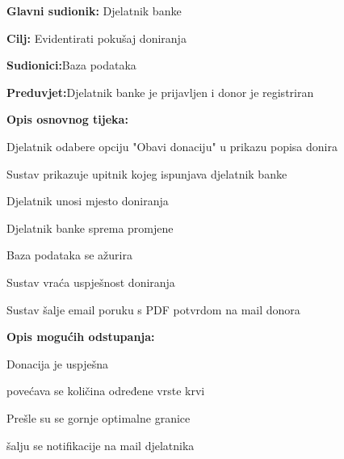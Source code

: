 \noindent {}

\begin{packed_item}
	
	\item \textbf{Glavni sudionik: }{Djelatnik banke}
	\item  \textbf{Cilj:} {Evidentirati pokušaj doniranja}
	\item  \textbf{Sudionici:}{Baza podataka} 
	\item  \textbf{Preduvjet:}{Djelatnik banke je prijavljen i donor je registriran}
	\item  \textbf{Opis osnovnog tijeka:}
	
	\item[] \begin{packed_enum}
		
		\item {Djelatnik odabere opciju "Obavi donaciju" u prikazu popisa donira}
		\item {Sustav  prikazuje upitnik kojeg ispunjava djelatnik banke}
		\item {Djelatnik unosi mjesto doniranja}
		\item {Djelatnik banke sprema promjene}
		\item {Baza podataka se ažurira}
		\item {Sustav vraća uspješnost doniranja}
		\item {Sustav šalje email poruku s PDF potvrdom na mail donora}
		
	\end{packed_enum}
	\item  \textbf{Opis mogućih odstupanja:}
	
	\item[] \begin{packed_item}
		\item[5.a] {Donacija je uspješna}
		\item[] \begin{packed_enum}
			
			\item povećava se količina određene vrste krvi
			
		\end{packed_enum}
		\item[5.b] {Prešle su se gornje optimalne granice}
		\item[] \begin{packed_enum}
			
			\item šalju se notifikacije na mail djelatnika
			

\end{packed_enum}
\end{packed_item}
\end{packed_item}
